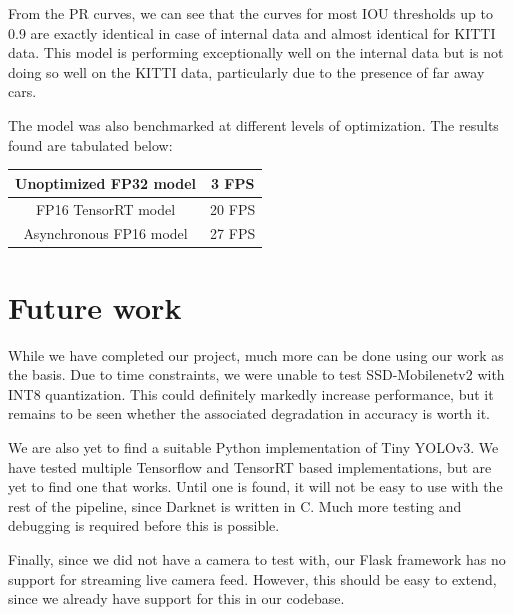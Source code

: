 \documentclass[12pt,letterpaper]{article}
\begin{document}
From the PR curves, we can see that the curves for most IOU thresholds up to 0.9 are exactly identical in case of internal data and almost identical for KITTI data. This model is performing exceptionally well on the internal data but is not doing so well on the KITTI data, particularly due to the presence of far away cars. 

The model was also benchmarked at different levels of optimization. The results found are tabulated below:

\begin{center}
\begin{tabular}{|c|c|}
    \hline
    Unoptimized FP32 model & 3 FPS \\
    \hline
    FP16 TensorRT model & 20 FPS \\
    \hline
    Asynchronous FP16 model & 27 FPS \\
    \hline
\end{tabular}
\end{center}


\section{Future work}

While we have completed our project, much more can be done using our work as the basis. Due to time constraints, we were unable to test SSD-Mobilenetv2 with INT8 quantization. This could definitely markedly increase performance, but it remains to be seen whether the associated degradation in accuracy is worth it.

We are also yet to find a suitable Python implementation of Tiny YOLOv3. We have tested multiple Tensorflow and TensorRT based implementations, but are yet to find one that works. Until one is found, it will not be easy to use with the rest of the pipeline, since Darknet is written in C. Much more testing and debugging is required before this is possible.

Finally, since we did not have a camera to test with, our Flask framework has no support for streaming live camera feed. However, this should be easy to extend, since we already have support for this in our codebase.


\pagebreak


\end{document}
